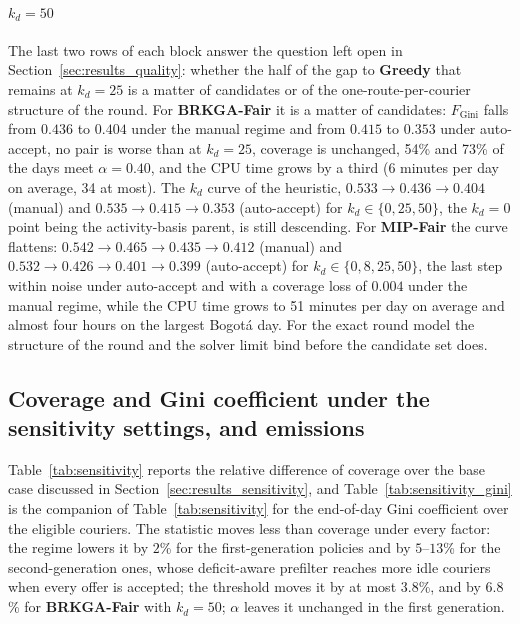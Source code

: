 \documentclass[a4paper,11pt,review,3p,authoryear]{elsarticle}
\newcommand{\FG}{F_{\text{Gini}}}
\begin{document}
\paragraph{$k_d = 50$} The last two rows of each block answer the question left open in Section~\ref{sec:results_quality}: whether the half of the gap to \textbf{Greedy} that remains at $k_d = 25$ is a matter of candidates or of the one-route-per-courier structure of the round. For \textbf{BRKGA-Fair} it is a matter of candidates: $\FG$ falls from $0.436$ to $0.404$ under the manual regime and from $0.415$ to $0.353$ under auto-accept, no pair is worse than at $k_d = 25$, coverage is unchanged, 54\% and 73\% of the days meet $\alpha = 0.40$, and the CPU time grows by a third (6 minutes per day on average, 34 at most). The $k_d$ curve of the heuristic, $0.533 \to 0.436 \to 0.404$ (manual) and $0.535 \to 0.415 \to 0.353$ (auto-accept) for $k_d \in \{0, 25, 50\}$, the $k_d = 0$ point being the activity-basis parent, is still descending. For \textbf{MIP-Fair} the curve flattens: $0.542 \to 0.465 \to 0.435 \to 0.412$ (manual) and $0.532 \to 0.426 \to 0.401 \to 0.399$ (auto-accept) for $k_d \in \{0, 8, 25, 50\}$, the last step within noise under auto-accept and with a coverage loss of $0.004$ under the manual regime, while the CPU time grows to 51 minutes per day on average and almost four hours on the largest Bogot\'a day. For the exact round model the structure of the round and the solver limit bind before the candidate set does.

\subsection{Coverage and Gini coefficient under the sensitivity settings, and emissions}
\label{sec:App_sens_gini}

Table~\ref{tab:sensitivity} reports the relative difference of coverage over the base case discussed in Section~\ref{sec:results_sensitivity}, and Table~\ref{tab:sensitivity_gini} is the companion of Table~\ref{tab:sensitivity} for the end-of-day Gini coefficient over the eligible couriers. The statistic moves less than coverage under every factor: the regime lowers it by $2$\% for the first-generation policies and by $5$--$13$\% for the second-generation ones, whose deficit-aware prefilter reaches more idle couriers when every offer is accepted; the threshold moves it by at most $3.8$\%, and by $6.8$\% for \textbf{BRKGA-Fair} with $k_d = 50$; $\alpha$ leaves it unchanged in the first generation.
\end{document}
